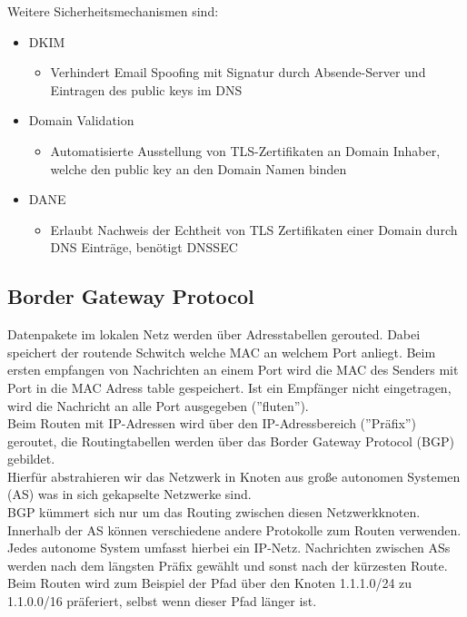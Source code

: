 \documentclass[a4paper,12pt,leqno]{article}
\begin{document}
Weitere Sicherheitsmechanismen sind:
\begin{itemize}
\item DKIM
	\begin{itemize}
	\item Verhindert Email Spoofing mit Signatur durch Absende-Server und Eintragen des public keys im DNS
	\end{itemize}
\item Domain Validation
	\begin{itemize}
	\item Automatisierte Ausstellung von TLS-Zertifikaten an Domain Inhaber, welche den public key an den Domain Namen binden
	\end{itemize}
\item DANE
	\begin{itemize}
	\item Erlaubt Nachweis der Echtheit von TLS Zertifikaten einer Domain durch DNS Einträge, benötigt DNSSEC
	\end{itemize}
\end{itemize}

\subsection{Border Gateway Protocol}

Datenpakete im lokalen Netz werden über Adresstabellen gerouted. Dabei speichert der routende Schwitch welche MAC an welchem Port anliegt. Beim ersten empfangen von Nachrichten an einem Port wird die MAC des Senders mit Port in die MAC Adress table gespeichert. Ist ein Empfänger nicht eingetragen, wird die Nachricht an alle Port ausgegeben (''fluten'').\\

Beim Routen mit IP-Adressen wird über den IP-Adressbereich (''Präfix'') geroutet, die Routingtabellen werden über das Border Gateway Protocol (BGP) gebildet.\\
Hierfür abstrahieren wir das Netzwerk in Knoten aus große autonomen Systemen (AS) was in sich gekapselte Netzwerke sind.\\
BGP kümmert sich nur um das Routing zwischen diesen Netzwerkknoten. Innerhalb der AS können verschiedene andere Protokolle zum Routen verwenden.\\
Jedes autonome System umfasst hierbei ein IP-Netz. Nachrichten zwischen ASs werden nach dem längsten Präfix gewählt und sonst nach der kürzesten Route. Beim Routen wird zum Beispiel der Pfad über den Knoten 1.1.1.0/24 zu 1.1.0.0/16 präferiert, selbst wenn dieser Pfad länger ist.\\
\end{document}
